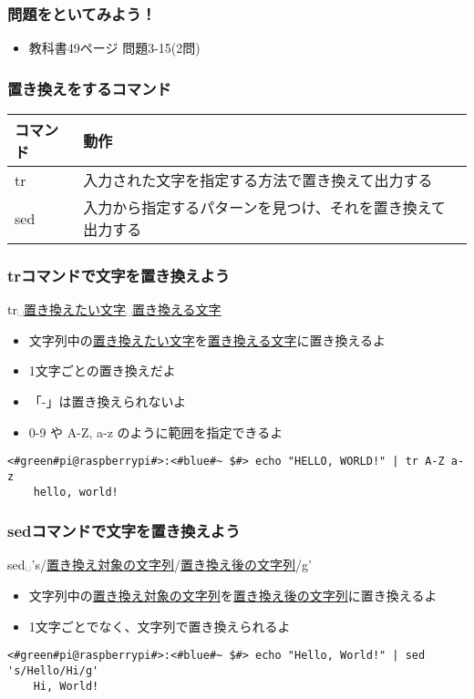 \begin{frame}
    \frametitle{問題をといてみよう！}
    \begin{itemize}
        \item 教科書49ページ 問題3-15(2問)
    \end{itemize}
\end{frame}

\begin{frame}
    \frametitle{置き換えをするコマンド}
    \begin{tabular}{ll}
        コマンド & 動作                                                       \\ \hline
        tr       & 入力された文字を指定する方法で置き換えて出力する           \\
        sed      & 入力から指定するパターンを見つけ、それを置き換えて出力する \\ \hline
    \end{tabular}
\end{frame}

\begin{frame}[fragile]
    \frametitle{trコマンドで文字を置き換えよう}
    tr␣\underline{置き換えたい文字}␣\underline{置き換える文字}
    \begin{itemize}
        \item 文字列中の\underline{置き換えたい文字}を\underline{置き換える文字}に置き換えるよ
        \item 1文字ごとの置き換えだよ
        \item 「-」は置き換えられないよ
        \item 0-9 や A-Z, a-z のように範囲を指定できるよ
    \end{itemize}
    \begin{lstlisting}[title=範囲指定を使った置き換え, label=tr_range]
    <#green#pi@raspberrypi#>:<#blue#~ $#> echo "HELLO, WORLD!" | tr A-Z a-z
    hello, world!
    \end{lstlisting}
\end{frame}

\begin{frame}[fragile]
    \frametitle{sedコマンドで文字を置き換えよう}
    sed␣'s/\underline{置き換え対象の文字列}/\underline{置き換え後の文字列}/g'
    \begin{itemize}
        \item 文字列中の\underline{置き換え対象の文字列}を\underline{置き換え後の文字列}に置き換えるよ
        \item 1文字ごとでなく、文字列で置き換えられるよ
    \end{itemize}
    \begin{lstlisting}[title=sed sedでの文字の置き換え, label=sed_app]
    <#green#pi@raspberrypi#>:<#blue#~ $#> echo "Hello, World!" | sed 's/Hello/Hi/g'
    Hi, World!
    \end{lstlisting}
\end{frame}

